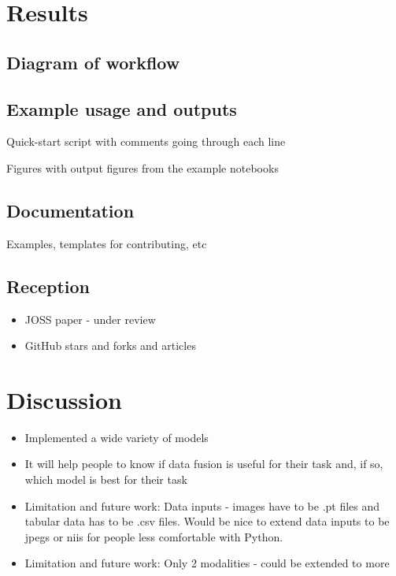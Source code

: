 \section{Results}

\subsection{Diagram of workflow}

\subsection{Example usage and outputs}
Quick-start script with comments going through each line

Figures with output figures from the example notebooks

\subsection{Documentation}
Examples, templates for contributing, etc


\subsection{Reception}
\begin{itemize}
    \item JOSS paper - under review 
    \item GitHub stars and forks and articles
\end{itemize}

\section{Discussion}
\begin{itemize}
    \item Implemented a wide variety of models
    \item It will help people to know if data fusion is useful for their task and, if so, which model is best for their task
    \item Limitation and future work: Data inputs - images have to be .pt files and tabular data has to be .csv files. Would be nice to extend data inputs to be jpegs or niis for people less comfortable with Python.
    \item Limitation and future work: Only 2 modalities - could be extended to more
\end{itemize}

